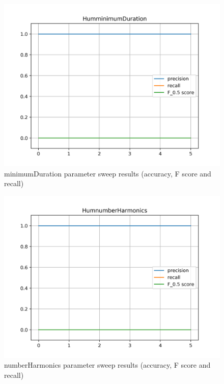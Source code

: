 \begin{figure}[!ht]
	\includegraphics[clip,width=\columnwidth]{Figures/HumminimumDuration.png}%
	\caption{minimumDuration parameter sweep results (accuracy, F score and recall)}
	\label{fig:humminimumDuration}
\end{figure}

\begin{figure}[!ht]
	\includegraphics[clip,width=\columnwidth]{Figures/HumnumberHarmonics.png}%
	\caption{numberHarmonics parameter sweep results (accuracy, F score and recall)}
	\label{fig:humnumberHarmonics}
\end{figure}

